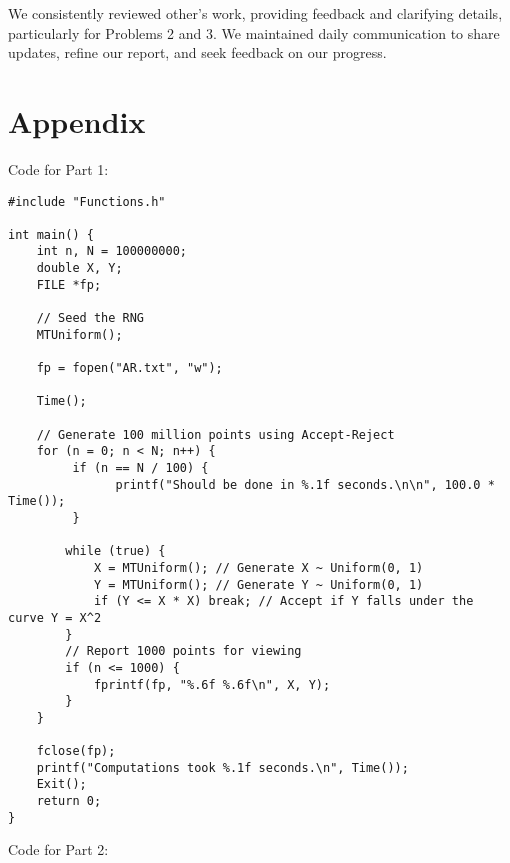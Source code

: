 \documentclass{report}
\begin{document}
We consistently reviewed other's work, providing feedback and clarifying details, particularly for Problems 2 and 3. We maintained daily communication to share updates, refine our report, and seek feedback on our progress.

\pagebreak


\section*{Appendix}
Code for Part 1:
\begin{lstlisting}[basicstyle=\ttfamily\scriptsize]
#include "Functions.h"

int main() {
    int n, N = 100000000;
    double X, Y;
    FILE *fp;

    // Seed the RNG
    MTUniform();

    fp = fopen("AR.txt", "w");

    Time();

    // Generate 100 million points using Accept-Reject
    for (n = 0; n < N; n++) {
         if (n == N / 100) {
               printf("Should be done in %.1f seconds.\n\n", 100.0 * Time());
         }
        
        while (true) {
            X = MTUniform(); // Generate X ~ Uniform(0, 1)
            Y = MTUniform(); // Generate Y ~ Uniform(0, 1)
            if (Y <= X * X) break; // Accept if Y falls under the curve Y = X^2
        }
        // Report 1000 points for viewing
        if (n <= 1000) {
            fprintf(fp, "%.6f %.6f\n", X, Y);
        }
    }

    fclose(fp);
    printf("Computations took %.1f seconds.\n", Time());
    Exit();
    return 0;
}

\end{lstlisting}
\pagebreak
Code for Part 2:
\end{document}
